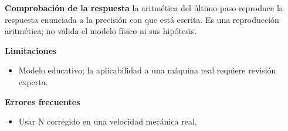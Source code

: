 \documentclass[10pt,openany]{book}
\begin{document}
\begin{tcolorbox}[title={Problema resuelto 3}, studiumworked, breakable]
\noindent\textbf{Comprobación de la respuesta} la aritmética del último paso reproduce la respuesta enunciada a la precisión con que está escrita. Es una reproducción aritmética; no valida el modelo físico ni sus hipótesis.

\noindent\textbf{Limitaciones}
\begin{itemize}
\item Modelo educativo; la aplicabilidad a una máquina real requiere revisión experta.
\end{itemize}

\noindent\textbf{Errores frecuentes}
\begin{itemize}
\item Usar N corregido en una velocidad mecánica real.
\end{itemize}
\end{tcolorbox}
\end{document}

